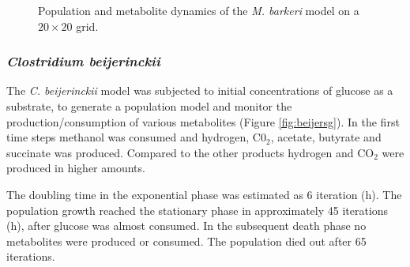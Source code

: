 \begin{figure}[h!]
{\begin{minipage}[t]{0.3\textwidth}
  \end{minipage}
  }
  \caption{Population and metabolite dynamics of the \emph{M. barkeri} model on a $20\times20$ grid.}
  \label{fig:barkerigrids}
\end{figure}
\subsubsection{\textit{Clostridium beijerinckii}}
The \textit{C. beijerinckii} model was subjected to initial concentrations of glucose as a substrate, to generate a population model and monitor the production/consumption of various metabolites (Figure \hyperref[fig:beijersg]{\ref{fig:beijersg}}). In the first time steps methanol was consumed and hydrogen, C0$_2$, acetate, butyrate and succinate was produced. Compared to the other products hydrogen and CO$_2$ were produced in higher amounts.

The doubling time in the exponential phase was estimated as 6 iteration (h).
The population growth reached the stationary phase in approximately 45 iterations (h), after glucose was almost consumed. In the subsequent death phase no metabolites were produced or consumed. The population died out after 65 iterations.

